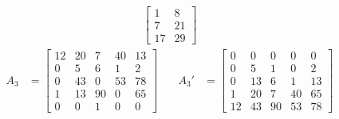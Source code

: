 \documentclass{article}
\begin{document}
\begin{enumerate}
\begin{example}
\begin{align*}
\begin{bmatrix}
                1 & 8 \\
                7 & 21 \\
                17 & 29 
            \end{bmatrix}
        \end{align*}
        \begin{align*}
            A_3 &= \begin{bmatrix}
                12 & 20 & 7 & 40 & 13 \\
                0 & 5 & 6 & 1 & 2 \\
                0 & 43 & 0 & 53 & 78 \\
                1 & 13 & 90 & 0 & 65 \\
                0 & 0 & 1 & 0 & 0 
            \end{bmatrix} &\quad
            A_3' &= \begin{bmatrix}
                0 & 0 & 0 & 0 & 0 \\
                0 & 5 & 1 & 0 & 2 \\
                0 & 13 & 6 & 1 & 13\\
                1 & 20 & 7 & 40 & 65 \\
                12 & 43 & 90 & 53 & 78
            \end{bmatrix}
        \end{align*}
    \end{example}
  \end{enumerate}
\end{document}
